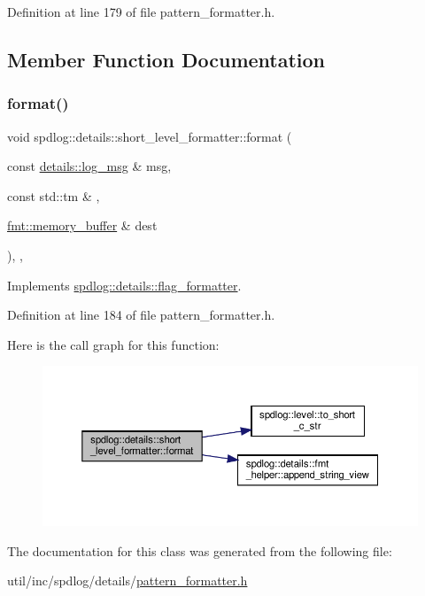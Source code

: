 Definition at line 179 of file pattern\+\_\+formatter.\+h.



\subsection{Member Function Documentation}
\mbox{\label{classspdlog_1_1details_1_1short__level__formatter_acf241e8ab58e6142e02a9c493034f81d}} 
\subsubsection{\texorpdfstring{format()}{format()}}
{\footnotesize\ttfamily void spdlog\+::details\+::short\+\_\+level\+\_\+formatter\+::format (\begin{DoxyParamCaption}\item[{const \hyperlink{structspdlog_1_1details_1_1log__msg}{details\+::log\+\_\+msg} \&}]{msg,  }\item[{const std\+::tm \&}]{,  }\item[{\hyperlink{format_8h_a21cbf729f69302f578e6db21c5e9e0d2}{fmt\+::memory\+\_\+buffer} \&}]{dest }\end{DoxyParamCaption})\hspace{0.3cm}{\ttfamily [inline]}, {\ttfamily [override]}, {\ttfamily [virtual]}}



Implements \hyperlink{classspdlog_1_1details_1_1flag__formatter_a33fb3e42a4c8200cceb833d92b53fb67}{spdlog\+::details\+::flag\+\_\+formatter}.



Definition at line 184 of file pattern\+\_\+formatter.\+h.

Here is the call graph for this function\+:
\nopagebreak
\begin{figure}[H]
\begin{center}
\leavevmode
\includegraphics[width=350pt]{classspdlog_1_1details_1_1short__level__formatter_acf241e8ab58e6142e02a9c493034f81d_cgraph}
\end{center}
\end{figure}


The documentation for this class was generated from the following file\+:\begin{DoxyCompactItemize}
\item 
util/inc/spdlog/details/\hyperlink{pattern__formatter_8h}{pattern\+\_\+formatter.\+h}\end{DoxyCompactItemize}
